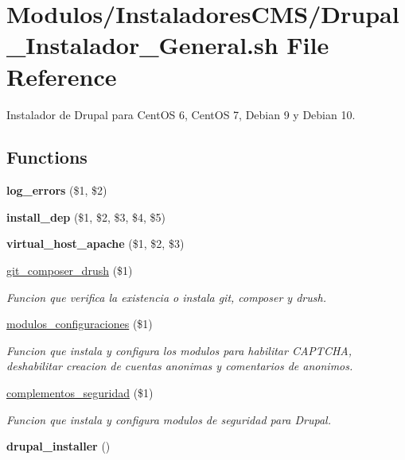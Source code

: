 \hypertarget{Drupal__Instalador__General_8sh}{}\section{Modulos/\+Instaladores\+C\+M\+S/\+Drupal\+\_\+\+Instalador\+\_\+\+General.sh File Reference}
\label{Drupal__Instalador__General_8sh}


Instalador de Drupal para Cent\+OS 6, Cent\+OS 7, Debian 9 y Debian 10.  


\subsection*{Functions}
\begin{DoxyCompactItemize}
\item 
\mbox{\label{Drupal__Instalador__General_8sh_a92067b58a8478c9841b2cd9b75ea3565}} 
{\bfseries log\+\_\+errors} (\$1, \$2)
\item 
\mbox{\label{Drupal__Instalador__General_8sh_a867cb91b69b68d903ea8d2ebcff6ea36}} 
{\bfseries install\+\_\+dep} (\$1, \$2, \$3, \$4, \$5)
\item 
\mbox{\label{Drupal__Instalador__General_8sh_a2ea632f8e04de9564521b12cf10c47f4}} 
{\bfseries virtual\+\_\+host\+\_\+apache} (\$1, \$2, \$3)
\item 
\hyperlink{Drupal__Instalador__General_8sh_a3cc44682ce03ae17ac41a78185920c59}{git\+\_\+composer\+\_\+drush} (\$1)
\begin{DoxyCompactList}\small\item\em Funcion que verifica la existencia o instala git, composer y drush. \end{DoxyCompactList}\item 
\hyperlink{Drupal__Instalador__General_8sh_ae5ce76ad68690ff00cb63811e18c8a37}{modulos\+\_\+configuraciones} (\$1)
\begin{DoxyCompactList}\small\item\em Funcion que instala y configura los modulos para habilitar C\+A\+P\+T\+C\+HA, deshabilitar creacion de cuentas anonimas y comentarios de anonimos. \end{DoxyCompactList}\item 
\hyperlink{Drupal__Instalador__General_8sh_a13df4a377004ee8af67f8e2495fe1afd}{complementos\+\_\+seguridad} (\$1)
\begin{DoxyCompactList}\small\item\em Funcion que instala y configura modulos de seguridad para Drupal. \end{DoxyCompactList}\item 
\mbox{\label{Drupal__Instalador__General_8sh_a829178a8034b48b89aa02399b2cef0f2}} 
{\bfseries drupal\+\_\+installer} ()
\end{DoxyCompactItemize}


